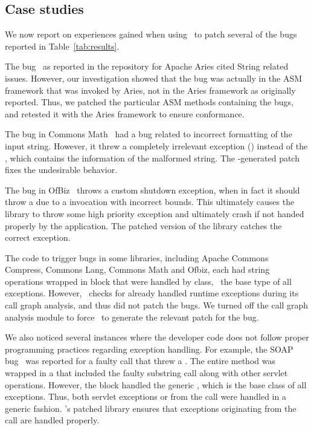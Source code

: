 \subsection{Case studies}
\label{sub:casestudies}

We now report on experiences gained when using \tool\ to patch several of the
bugs reported in Table~\ref{tab:results}.

\begin{mylist}

 \item The bug~\cite{ARIES1204} as reported in the repository for Apache Aries
cited String related issues. However, our investigation showed that the bug was
actually in the ASM framework that was invoked by Aries, not in the Aries
framework as originally reported. Thus, we patched the particular ASM methods
containing the bugs, and retested it with the Aries framework to ensure
conformance.

 \item The bug in Commons Math~\cite{MATH198} had a bug related to incorrect
formatting of the input string. However, it threw a completely irrelevant
exception () instead of the ,
which contains the information of the malformed string. The \tool-generated
patch fixes the undesirable behavior.

 \item The bug in OfBiz~\cite{OFBIZ4237} throws a custom shutdown exception,
when in fact it should throw a  due to a
 invocation with incorrect bounds. This ultimately causes the
library to throw some high priority exception and ultimately crash if not handed
properly by the application. The patched version of the library catches the
correct exception.

 \item The code to trigger bugs in some libraries, including Apache Commons
Compress, Commons Lang, Commons Math and Ofbiz, each had string operations
wrapped in  block that were handled by  class,
\ie\ the base type of all exceptions. However, \tool\ checks for already
handled runtime exceptions during its call graph analysis, and thus did not
patch the bugs. We turned off the call graph analysis module to force \tool\ to
generate the relevant patch for the bug.

 \item We also noticed several instances where the developer code does not
follow proper programming practices regarding exception handling. For example,
the SOAP bug~\cite{SOAP130} was reported for a faulty  call that
threw a . The entire method was wrapped in
a  that included the faulty substring call along with other
servlet operations. However, the  block handled the generic
, which is the base class of all exceptions. Thus, both servlet
exceptions or  from the  call
were handled in a generic fashion. \tool's patched library ensures that
exceptions originating from the  call are handled properly.

\end{mylist}